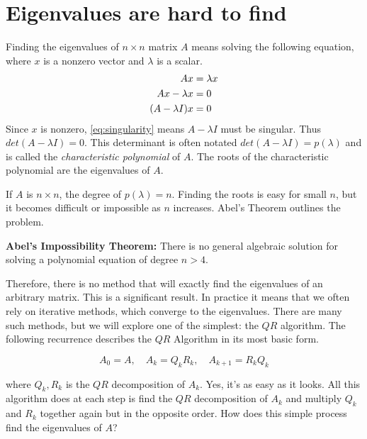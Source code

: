 \label{Ch:EigSolve}


\section*{Eigenvalues are hard to find}

Finding the eigenvalues of $n \times n$ matrix $A$ means solving the following equation, where $x$ is a nonzero vector and $\lambda$ is a scalar.
\begin{align} 
 A x                       &=  \lambda x  \notag \\
A x - \lambda x &= 0 \notag \\
(A - \lambda I)x  &= 0 \label{eq:singularity}
\end{align}
Since $x$ is nonzero, \eqref{eq:singularity} means $A-\lambda I$ must be singular. Thus $det(A-\lambda I) = 0$.  This determinant is often notated $det(A-\lambda I) = p(\lambda)$ and is called the \emph{characteristic polynomial} of $A$. The roots of the characteristic polynomial are the eigenvalues of $A$.

If $A$ is $n \times n$, the degree of $p(\lambda) = n$.   Finding the roots is easy for small $n$, but it becomes difficult or impossible as $n$ increases.  Abel's Theorem  outlines the problem.

\begin{theorem}
\label{Theorem:Abel}
{\bf Abel's Impossibility Theorem:} There is no general algebraic solution for solving a polynomial equation of degree $n>4$.
\end{theorem}

Therefore, there is no method that will exactly find the eigenvalues of an arbitrary matrix. This is a significant result. In practice it means that we often rely on iterative methods, which converge to the eigenvalues. There are many such methods, but we will explore one of the simplest: the $QR$ algorithm. The following recurrence describes the $QR$ Algorithm in its most basic form. 

\begin{equation*}
A_0 = A, \quad A_k = Q_k R_k, \quad A_{k+1} = R_k Q_k
\end{equation*}

where $Q_k, R_k$ is the $QR$ decomposition of $A_k$. Yes, it's as easy as it looks. All this algorithm does at each step is find the $QR$ decomposition of $A_k$ and multiply $Q_k$ and $R_k$ together again but in the opposite order. How does this simple process find the eigenvalues of $A$? 

